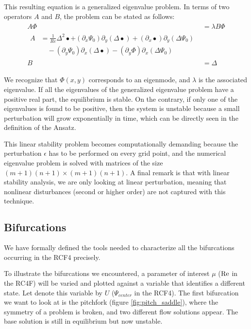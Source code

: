 This resulting equation is a generalized eigenvalue problem. In terms of two
operators $A$ and $B$, the problem can be stated as follows: 
\begin{align} \label{eq:eig_prob}
  \begin{split}
  A \Phi & = \lambda B \Phi \\[4pt]
  \begin{split}
  A & = \frac{1}{Re} \Delta^2 \bullet
    + (\partial_x \Psi_0) \partial_y (\Delta \bullet)
    + (\partial_x \bullet) \partial_y (\Delta \Psi_0) \\
    &\quad - (\partial_y \Psi_0) \partial_x (\Delta \bullet)
    - (\partial_y \Phi) \partial_x (\Delta \Psi_0)
  \end{split} \\
  B & = \Delta
  \end{split}
\end{align}

We recognize that $\Phi(x,y)$ corresponds to an eigenmode, and $\lambda$ is the
associated eigenvalue. If all the eigenvalues of the generalized eigenvalue
problem have a positive real part, the equilibrium is stable. On the contrary,
if only one of the eigenvalues is found to be positive, then the system is
unstable because a small perturbation will grow exponentially in time, which
can be directly seen in the definition of the Ansatz.

This linear stability problem becomes computationally demanding because the
perturbation $\epsilon$ has to be performed on every grid point, and the
numerical eigenvalue problem is solved with matrices of the size $(m+1)(n+1)
\times (m+1)(n+1)$. A final remark is that with linear stability analysis, we
are only looking at linear perturbation, meaning that nonlinear disturbances
(second or higher order) are not captured with this technique.

\subsection{Bifurcations} \label{sec:bif_details}

We have formally defined the tools needed to characterize all the bifurcations
occurring in the RCF4 precisely. 

To illustrate the bifurcations we encountered, a parameter of interest $\mu$
($\mathrm{Re}$ in the RC4F) will be varied and plotted against a variable that
identifies a different state. Let denote this variable by $U$ ($\Psi_{center}$
in the RCF4). The first bifurcation we want to look at is the pitchfork (figure
\ref{fig:pitch_saddle}), where the symmetry of a problem is broken, and two
different flow solutions appear. The base solution is still in equilibrium but
now unstable.

